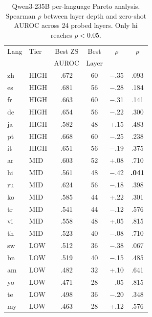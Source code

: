 \documentclass[11pt,a4paper]{article}
\newcommand{\auroc}{AUROC}
\begin{document}
\begin{table}[t]
\centering
\small
\caption{Qwen3-235B per-language Pareto analysis. Spearman $\rho$ between layer depth and zero-shot \auroc{} across 24 probed layers. Only hi reaches $p < 0.05$.}
\label{tab:pareto_qwen}
\begin{tabular}{llcccc}
\toprule
Lang & Tier & Best ZS & Best & $\rho$ & $p$ \\
     &      & \auroc{} & Layer &       &     \\
\midrule
zh & HIGH & .672 & 60 & $-$.35 & .093 \\
es & HIGH & .681 & 56 & $-$.28 & .184 \\
fr & HIGH & .663 & 60 & $-$.31 & .141 \\
de & HIGH & .654 & 56 & $-$.22 & .300 \\
ja & HIGH & .582 & 48 & +.15 & .483 \\
pt & HIGH & .668 & 60 & $-$.25 & .238 \\
it & HIGH & .651 & 56 & $-$.19 & .375 \\
\midrule
ar & MID & .603 & 52 & +.08 & .710 \\
hi & MID & .561 & 48 & $-$.42 & \textbf{.041} \\
ru & MID & .624 & 56 & $-$.18 & .398 \\
ko & MID & .585 & 44 & +.22 & .301 \\
tr & MID & .541 & 44 & $-$.12 & .576 \\
vi & MID & .558 & 48 & +.05 & .815 \\
th & MID & .523 & 40 & $-$.08 & .710 \\
\midrule
sw & LOW & .512 & 36 & $-$.38 & .067 \\
bn & LOW & .519 & 40 & $-$.15 & .485 \\
am & LOW & .482 & 32 & +.10 & .641 \\
yo & LOW & .471 & 28 & $-$.05 & .815 \\
te & LOW & .498 & 36 & $-$.20 & .348 \\
my & LOW & .463 & 28 & +.12 & .576 \\
\bottomrule
\end{tabular}
\end{table}
\end{document}
